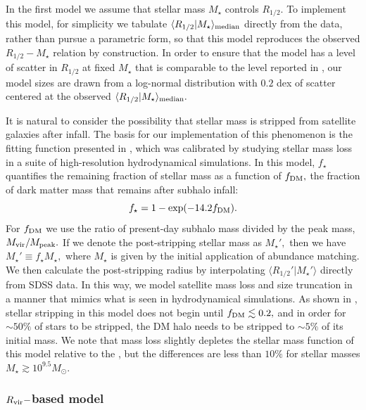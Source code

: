 \documentclass[usenatbib,usegraphicx,letterpaper]{mn2e}
\newcommand{\beq}{\begin{equation}}
\newcommand{\eeq}{\end{equation}}
\newcommand{\rhalf}{R_{1/2}}
\newcommand{\mstar}{M_{\star}}
\newcommand{\rvir}{R_{\rm vir}}
\newcommand{\median}[2]{\langle{#1}\vert{#2}\rangle_{\rm median}}
\newcommand{\msun}{M_\odot}
\begin{document}
In the first model we assume that stellar mass $\mstar$ controls $\rhalf.$ To implement this model, for simplicity we tabulate $\median{\rhalf}{\mstar}$ directly from the data, rather than pursue a parametric form, so that this model reproduces the observed $\rhalf-\mstar$ relation by construction. In order to ensure that the model has a level of scatter in $\rhalf$ at fixed $\mstar$ that is comparable to the level reported in \citet{somerville_etal17}, our model sizes are drawn from a log-normal distribution with $0.2$ dex of scatter centered at the observed $\median{\rhalf}{\mstar}.$

It is natural to consider the possibility that stellar mass is stripped from satellite galaxies after infall. The basis for our implementation of this phenomenon is the fitting function presented in \citet{smith_etal16}, which was calibrated by studying stellar mass loss in a suite of high-resolution hydrodynamical simulations. In this model, $f_{\star}$ quantifies the remaining fraction of stellar mass as a function of $f_{\rm DM},$ the fraction of dark matter mass that remains after subhalo infall:
\beq
f_{\star} = 1 - \exp(-14.2f_{\rm DM}).
\eeq
For $f_{\rm DM}$ we use the ratio of present-day subhalo mass divided by the peak mass, $M_{\rm vir}/M_{\rm peak}.$ If we denote the post-stripping stellar mass as $M_{\star}',$ then we have $M_{\star}'\equiv f_{\star}M_{\star},$ where $M_{\star}$ is given by the initial application of abundance matching. We then calculate the post-stripping radius by interpolating $\langle\rhalf'\vert\mstar'\rangle$ directly from SDSS data. In this way, we model satellite mass loss and  size truncation in a manner that mimics what is seen in hydrodynamical simulations. As shown in \citet{smith_etal16}, stellar stripping in this model does not begin until $f_{\rm DM}\lesssim0.2,$ and in order for $\sim50\%$ of stars to be stripped, the DM halo needs to be stripped to $\sim5\%$ of its initial mass. We note that mass loss slightly depletes the stellar mass function of this model relative to the \citet{moustakas_etal13}, but the differences are less than $10\%$ for stellar masses $\mstar\gtrsim10^{9.5}\msun.$

\subsubsection{$\rvir-$based model}
\label{subsubsec:rvirmodel}
\end{document}
